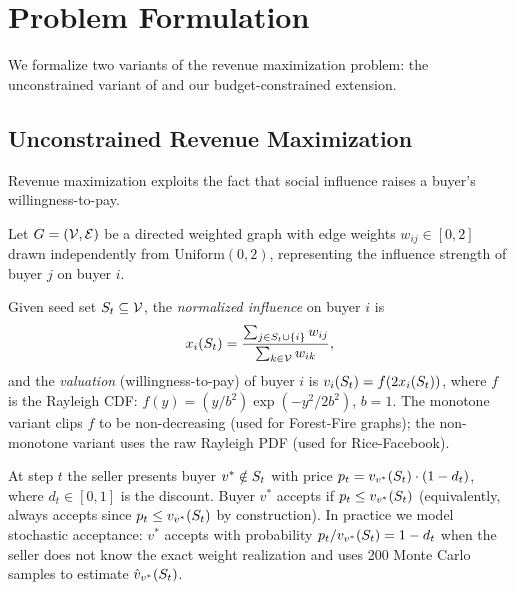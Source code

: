 
\section{Problem Formulation}
\label{sec:problem}

We formalize two variants of the revenue maximization problem:
the unconstrained variant of \citet{babaei2013revenue} and our
budget-constrained extension.

\subsection{Unconstrained Revenue Maximization}
\label{sec:babaei}

Revenue maximization exploits the fact that social influence raises a buyer's
willingness-to-pay.

\begin{definition}
Let $G = (\mathcal{V}, \mathcal{E})$ be a directed weighted graph with edge weights
$w_{ij} \in [0,2]$ drawn independently from $\mathrm{Uniform}(0,2)$,
representing the influence strength of buyer $j$ on buyer $i$.
\end{definition}

\begin{definition}[Valuation]
Given seed set $S_t \subseteq \mathcal{V}$, the \emph{normalized influence} on buyer
$i$ is
\[
  x_i(S_t) = \frac{\sum_{j \in S_t \cup \{i\}} w_{ij}}{\sum_{k \in \mathcal{V}} w_{ik}},
\]
and the \emph{valuation} (willingness-to-pay) of buyer $i$ is
$v_i(S_t) = f\!\left(2 x_i(S_t)\right)$,
where $f$ is the Rayleigh CDF: $f(y) = (y/b^2)\exp(-y^2/2b^2)$, $b=1$.
The monotone variant clips $f$ to be non-decreasing (used for Forest-Fire graphs);
the non-monotone variant uses the raw Rayleigh PDF (used for Rice-Facebook).
\end{definition}

\begin{definition}
At step $t$ the seller presents buyer $v^* \notin S_t$ with price
$p_t = v_{v^*}(S_t) \cdot (1 - d_t)$, where $d_t \in [0,1]$ is the discount.
Buyer $v^*$ accepts if $p_t \le v_{v^*}(S_t)$
(equivalently, always accepts since $p_t \le v_{v^*}(S_t)$ by construction).
In practice we model stochastic acceptance: $v^*$ accepts with probability
$p_t / v_{v^*}(S_t) = 1 - d_t$ when the seller does not know the exact
weight realization and uses 200 Monte Carlo samples to estimate
$\hat{v}_{v^*}(S_t)$.
\end{definition}


